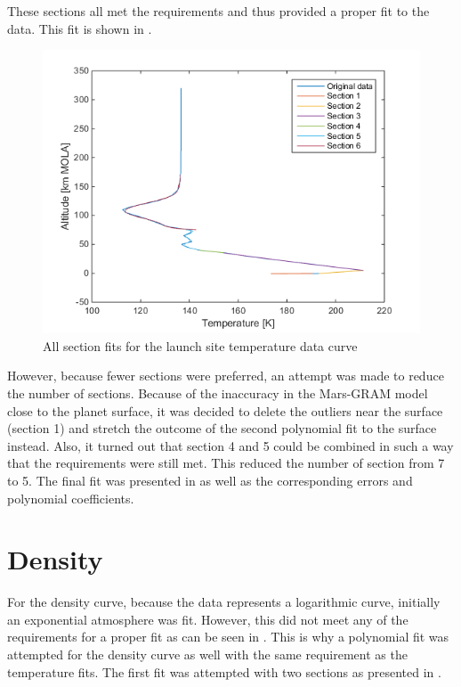These sections all met the requirements and thus provided a proper fit to the data. This fit is shown in .

\begin{figure}[!ht]
\centering
\includegraphics[width=0.9 \textwidth]{figures/software/completePolyFitTempSplit7.png}
\caption{All section fits for the launch site temperature data curve}
\label{fig:completePolyFitTempSplit7}
\end{figure}

However, because fewer sections were preferred, an attempt was made to reduce the number of sections. Because of the inaccuracy in the Mars-\ac{GRAM} model close to the planet surface, it was decided to delete the outliers near the surface (section 1) and stretch the outcome of the second polynomial fit to the surface instead. Also, it turned out that section 4 and 5 could be combined in such a way that the requirements were still met. This reduced the number of section from 7 to 5. The final fit was presented in  as well as the corresponding errors and polynomial coefficients.                                                                                      




\section{Density}
\label{appsec:denFit}
For the density curve, because the data represents a logarithmic curve, initially an exponential atmosphere was fit. However, this did not meet any of the requirements for a proper fit as can be seen in . This is why a polynomial fit was attempted for the density curve as well with the same requirement as the temperature fits. The first fit was attempted with two sections as presented in . 

